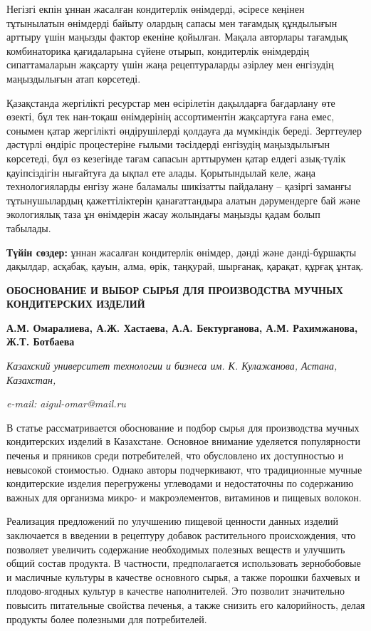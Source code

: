 Негізгі екпін ұннан жасалған кондитерлік өнімдерді, әсіресе кеңінен
тұтынылатын өнімдерді байыту олардың сапасы мен тағамдық құндылығын
арттыру үшін маңызды фактор екеніне қойылған. Мақала авторлары тағамдық
комбинаторика қағидаларына сүйене отырып, кондитерлік өнімдердің
сипаттамаларын жақсарту үшін жаңа рецептураларды әзірлеу мен енгізудің
маңыздылығын атап көрсетеді.

Қазақстанда жергілікті ресурстар мен өсірілетін дақылдарға бағдарлану
өте өзекті, бұл тек нан-тоқаш өнімдерінің ассортиментін жақсартуға ғана
емес, сонымен қатар жергілікті өндірушілерді қолдауға да мүмкіндік
береді. Зерттеулер дәстүрлі өндіріс процестеріне ғылыми тәсілдерді
енгізудің маңыздылығын көрсетеді, бұл өз кезегінде тағам сапасын
арттырумен қатар елдегі азық-түлік қауіпсіздігін нығайтуға да ықпал ете
алады. Қорытындылай келе, жаңа технологияларды енгізу және баламалы
шикізатты пайдалану -- қазіргі заманғы тұтынушылардың қажеттіліктерін
қанағаттандыра алатын дәрумендерге бай және экологиялық таза ұн
өнімдерін жасау жолындағы маңызды қадам болып табылады.

{\bfseries Түйін сөздер:} ұннан жасалған кондитерлік өнімдер, дәнді және
дәнді-бұршақты дақылдар, асқабақ, қауын, алма, өрік, таңқурай, шырғанақ,
қарақат, құрғақ ұнтақ.

\begin{articleheader}
{\bfseries ОБОСНОВАНИЕ И ВЫБОР СЫРЬЯ ДЛЯ ПРОИЗВОДСТВА МУЧНЫХ КОНДИТЕРСКИХ ИЗДЕЛИЙ}

{\bfseries
А.М. Омаралиева\textsuperscript{\envelope },
А.Ж. Хастаева,
А.А. Бектурганова,
А.М. Рахимжанова,
Ж.Т. Ботбаева}
\end{articleheader}

\begin{affiliation}
\emph{Казахский университет технологии и бизнеса им. К. Кулажанова, Астана, Казахстан,}

\emph{e-mail: aigul-omar@mail.ru}
\end{affiliation}

В статье рассматривается обоснование и подбор сырья для производства
мучных кондитерских изделий в Казахстане. Основное внимание уделяется
популярности печенья и пряников среди потребителей, что обусловлено их
доступностью и невысокой стоимостью. Однако авторы подчеркивают, что
традиционные мучные кондитерские изделия перегружены углеводами и
недостаточны по содержанию важных для организма микро- и макроэлементов,
витаминов и пищевых волокон.

Реализация предложений по улучшению пищевой ценности данных изделий
заключается в введении в рецептуру добавок растительного происхождения,
что позволяет увеличить содержание необходимых полезных веществ и
улучшить общий состав продукта. В частности, предполагается использовать
зернобобовые и масличные культуры в качестве основного сырья, а также
порошки бахчевых и плодово-ягодных культур в качестве наполнителей. Это
позволит значительно повысить питательные свойства печенья, а также
снизить его калорийность, делая продукты более полезными для
потребителей.

